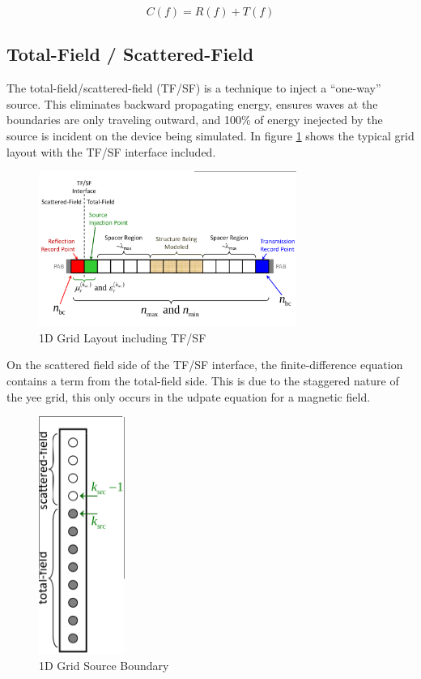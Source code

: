 \documentclass[a4paper,10pt]{article}
\begin{document}
\begin{equation}
 C(f) = R(f) + T(f)
\end{equation}

\subsection{Total-Field / Scattered-Field}

The total-field/scattered-field (TF/SF) is a technique to inject a ``one-way'' source.  This eliminates backward propagating energy, ensures waves at the boundaries are only traveling outward, and 100\% of energy inejected by the source is incident on the device being simulated.  In figure \ref{fig:1DGridLayout} shows the typical grid layout with the TF/SF interface included. 

\begin{figure}[ht]
  \label{fig:1DGridLayout}
   \centering
     \includegraphics[width=0.75\textwidth]{1DGridLayout.png}
   \caption{1D Grid Layout including TF/SF}
\end{figure}

On the scattered field side of the TF/SF interface, the finite-difference equation contains a term from the total-field side.  This is due to the staggered nature of the yee grid, this only occurs in the udpate equation for a magnetic field.

\begin{figure}[ht]
  \label{fig:1DGridSourceBoundary}
   \centering
     \includegraphics[width=0.25\textwidth]{1DGridSourceBoundary.png}
   \caption{1D Grid Source Boundary}
\end{figure}
\end{document}

